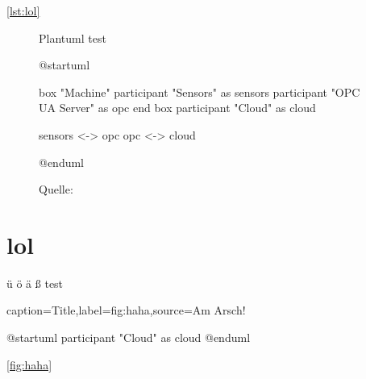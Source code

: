 \documentclass[%
    debug           = true,
    auto-generate   = true,
    print-ndn       = true,
    plantuml        = true
]{udhbwvst}
\begin{document}


\autoref{lst:lol}

\blindtext

\begin{figure}[h]
    \centering
    \caption{Plantuml test}
    \begin{plantuml}
        @startuml

        box "Machine"
            participant "Sensors" as sensors
            participant "OPC UA Server" as opc
        end box
        participant "Cloud" as cloud

        sensors <-> opc
        opc <-> cloud

        @enduml    
    \end{plantuml}
    \caption*{\footnotesize{Quelle: }}
    \label{fig:plantuml_test}
\end{figure}

\section{lol}

ü ö ä ß test

\lipsum

\begin{dhbwfigure}{caption=Title,label=fig:haha,source={Am Arsch!}}
    \begin{plantuml}
        @startuml
        participant "Cloud" as cloud
        @enduml            
    \end{plantuml}
\end{dhbwfigure}

\autoref{fig:haha}
\end{document}
